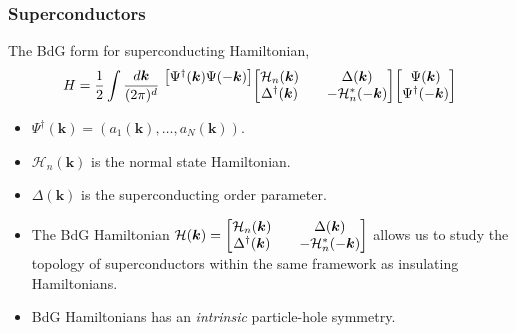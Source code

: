 \documentclass{beamer}
\newcommand{\mc}{\mathcal}
\renewcommand{\(}{\left(}
\renewcommand{\)}{\right)}
\renewcommand{\[}{\left[}
\renewcommand{\]}{\right]}
\begin{document}
\begin{frame}
    \frametitle{Superconductors}
    The BdG form for superconducting Hamiltonian, 
    \begin{align*}
        H =\frac{1}{2}\int \frac{d\bm k}{(2\pi)^{d}}  \  \mqty{\mqty[\Psi^\dagger(\bm k)  \Psi(-\bm k)] \\ \mbox{}}
        \mqty[\mc H_n(\bm k) && \Delta(\bm k) \\ 
        \Delta^\dagger (\bm k) && -\mc H^*_n(-\bm k)] \mqty[\Psi(\bm k) \\ 
        \Psi^\dagger(-\bm k)]
    \end{align*}
    \begin{itemize}
        \item $\Psi^\dagger(\bm k) = (a_1(\bm k), \dots, a_N(\bm k))$.
        \item $\mc H_n(\bm k)$ is the normal state Hamiltonian.
        \item $\Delta(\bm k)$ is the superconducting order parameter.
        \item The BdG Hamiltonian $ \mc H(\bm k) = \mqty[\mc H_n(\bm k) && \Delta(\bm k) \\ 
        \Delta^\dagger (\bm k) && -\mc H^*_n(-\bm k)]$ allows us to study the topology of superconductors within the same framework as insulating Hamiltonians. 
        \item BdG Hamiltonians has an \emph{intrinsic} particle-hole symmetry. 
    \end{itemize}
\end{frame}
\end{document}
